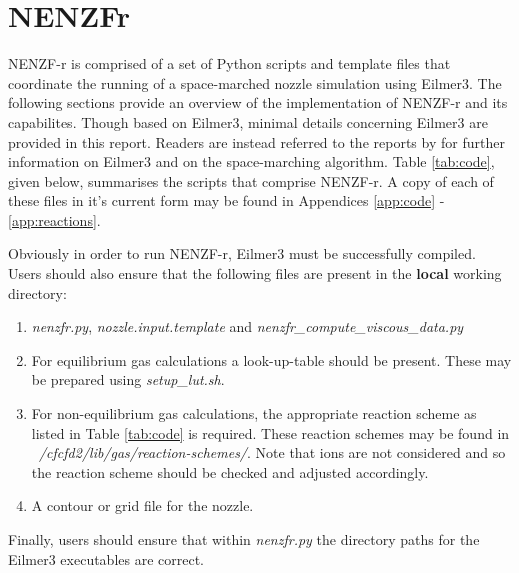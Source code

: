 
\newpage
\section{NENZFr}
\label{chapter-nenzfr}

NENZF-r is comprised of a set of Python scripts and template files that coordinate the running of a space-marched nozzle simulation using Eilmer3. The following sections provide an overview of the implementation of NENZF-r and its capabilites. Though based on Eilmer3, minimal details concerning Eilmer3 are provided in this report. Readers are instead referred to the reports by \cite{} for further information on Eilmer3 and on the space-marching algorithm. Table \ref{tab:code}, given below, summarises the scripts that comprise NENZF-r. A copy of each of these files in it's current form may be found in Appendices \ref{app:code} - \ref{app:reactions}. 

Obviously in order to run NENZF-r, Eilmer3 must be successfully compiled. Users should also ensure that the following files are present in the \textbf{local} working directory:
\begin{enumerate}
\item \textit{nenzfr.py}, \textit{nozzle.input.template} and \textit{nenzfr\_compute\_viscous\_data.py}
\item For equilibrium gas calculations a look-up-table should be present. These may be prepared using \textit{setup\_lut.sh}.
\item For non-equilibrium gas calculations, the appropriate reaction scheme as listed in Table \ref{tab:code} is required. These reaction schemes may be found in \textit{~/cfcfd2/lib/gas/reaction-schemes/}. Note that ions are not considered and so the reaction scheme should be checked and adjusted accordingly.
\item A contour or grid file for the nozzle.
\end{enumerate}
Finally, users should ensure that within \textit{nenzfr.py} the directory paths for the Eilmer3 executables are correct. 

